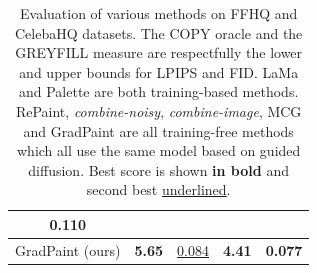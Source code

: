 \begin{table}[t]
\begin{tabular}{|l|c|c|c|c|}
  \multicolumn{1}{c|}{0.110}\\ \hline
GradPaint (ours) &
  \multicolumn{1}{c|}{\textbf{5.65}} &
  \multicolumn{1}{c|}{{\underline{0.084}}}
   &
  \multicolumn{1}{c|}{\textbf{4.41}} &
  \multicolumn{1}{c|}{\textbf{0.077}} \\ \hline
\end{tabular}
 
\caption{Evaluation of various methods on FFHQ and CelebaHQ datasets. The COPY oracle and the GREYFILL measure are respectfully the lower and upper bounds for LPIPS and FID. LaMa and Palette are both training-based methods. RePaint, \emph{combine-noisy}, \emph{combine-image}, MCG and GradPaint are all training-free methods which all use the same model based on guided diffusion\cite{guided-diffusion}. Best score is shown \textbf{in bold} and second best \underline{underlined}.}
\label{main_results}
\end{table}


